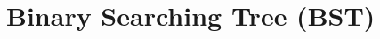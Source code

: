 \documentclass[../main.tex]{subfiles}
\begin{document}






\section{Binary Searching Tree (BST)}
\end{document}
